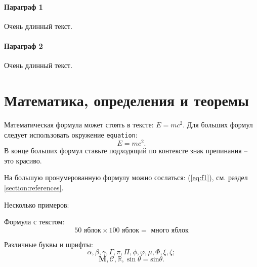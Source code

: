 \documentclass[a4paper, 14pt]{extreport}
\begin{document}
\paragraph{Параграф 1} 

Очень длинный текст.

\paragraph{Параграф 2} Очень длинный текст.




\section{Математика, определения и теоремы}

Математическая формула может стоять в тексте: $E = mc^2$. Для больших формул следует использовать окружение \verb!equation!:
\begin{equation}\label{eq:f1}
    E = mc^2.
\end{equation}
В конце больших формул ставьте подходящий по контексте знак препинания -- это красиво.

На большую пронумерованную формулу можно сослаться: (\ref{eq:f1}), см. раздел \ref{section:references}.

Несколько примеров:

Формула с текстом:
\begin{equation}
    50 \text{ яблок} \times 100 \text{ яблок} =
    \textbf{ много яблок}
\end{equation}

 Различные буквы и шрифты:
\begin{equation}
    \alpha,  \beta,  \gamma, \Gamma, \pi, \Pi, \phi, \varphi, \mu, \Phi, \xi, \zeta;
\end{equation}
\begin{equation}
    \mathbf M, \mathcal C, \mathbb R, \sin \theta = \mathrm{sin} \theta.
\end{equation}
\end{document}
